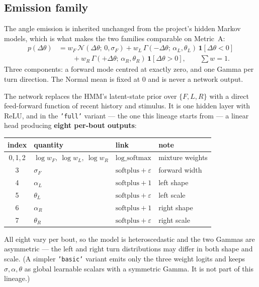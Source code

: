 \documentclass[11pt,a4paper]{article}
\newcommand{\dth}{\ensuremath{\Delta\theta}}
\newcommand{\code}[1]{\texttt{\small #1}}
\begin{document}
\subsection{Emission family}

The angle emission is inherited unchanged from the project's hidden Markov models, which
is what makes the two families comparable on Metric~A:
\begin{align}
p(\dth) &= w_F\,\mathcal{N}(\dth;\,0,\sigma_F)
         + w_L\,\Gamma(-\dth;\,\alpha_L,\theta_L)\,\mathbf{1}[\dth<0] \nonumber\\
        &\qquad + w_R\,\Gamma(+\dth;\,\alpha_R,\theta_R)\,\mathbf{1}[\dth>0],
        \qquad \textstyle\sum w = 1 .
\end{align}
Three components: a forward mode centred at exactly zero, and one Gamma per turn
direction. The Normal mean is fixed at $0$ and is never a network output.

The network replaces the HMM's latent-state prior over $\{F,L,R\}$ with a direct
feed-forward function of recent history and stimulus. It is one hidden layer with ReLU,
and in the \code{'full'} variant --- the one this lineage starts from --- a linear head
producing \textbf{eight per-bout outputs}:

\begin{center}\small
\begin{tabular}{clll}
\toprule
\textbf{index} & \textbf{quantity} & \textbf{link} & \textbf{note} \\
\midrule
0,\,1,\,2 & $\log w_F,\ \log w_L,\ \log w_R$ & $\mathrm{log\_softmax}$ & mixture weights \\
3 & $\sigma_F$   & $\mathrm{softplus}+\varepsilon$ & forward width \\
4 & $\alpha_L$   & $\mathrm{softplus}+1$ & left shape \\
5 & $\theta_L$   & $\mathrm{softplus}+\varepsilon$ & left scale \\
6 & $\alpha_R$   & $\mathrm{softplus}+1$ & right shape \\
7 & $\theta_R$   & $\mathrm{softplus}+\varepsilon$ & right scale \\
\bottomrule
\end{tabular}
\end{center}

All eight vary per bout, so the model is heteroscedastic and the two Gammas are
asymmetric --- the left and right turn distributions may differ in both shape and scale.
(A simpler \code{'basic'} variant emits only the three weight logits and keeps
$\sigma,\alpha,\theta$ as global learnable scalars with a symmetric Gamma. It is not part
of this lineage.)
\end{document}
